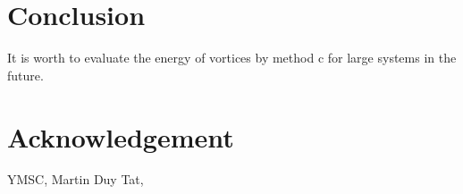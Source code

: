 \documentclass{article}
\begin{document}


\section{Conclusion}\label{sec6}
\label{sec:conclusion}
It is worth to evaluate the energy of vortices by method c for large systems in the future.

\section{Acknowledgement}
YMSC, Martin Duy Tat, 




\end{document}
